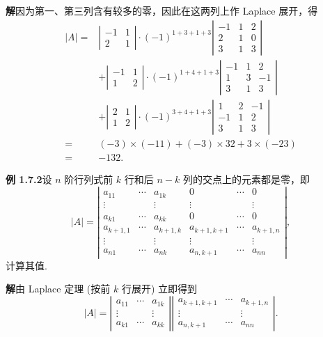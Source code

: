 \documentclass[UTF8,12pt,a4paper,fontset=fandol]{ctexart}
\begin{document}
\noindent\textbf{解}\quad 因为第一、第三列含有较多的零，因此在这两列上作 Laplace 展开，得
\[
\begin{aligned}
|A|={}&
\left|\begin{array}{rr}-1&1\\2&1\end{array}\right|
\cdot(-1)^{1+3+1+3}
\left|\begin{array}{rrr}-1&1&2\\2&1&0\\3&1&3\end{array}\right|\\
&+
\left|\begin{array}{rr}-1&1\\1&2\end{array}\right|
\cdot(-1)^{1+4+1+3}
\left|\begin{array}{rrr}-1&1&2\\1&3&-1\\3&1&3\end{array}\right|\\
&+
\left|\begin{array}{rr}2&1\\1&2\end{array}\right|
\cdot(-1)^{3+4+1+3}
\left|\begin{array}{rrr}1&2&-1\\-1&1&2\\3&1&3\end{array}\right|\\
= {}& (-3)\times(-11)+(-3)\times32+3\times(-23)\\
= {}& -132.
\end{aligned}
\]

\noindent\textbf{例 1.7.2}\quad 设 $n$ 阶行列式前 $k$ 行和后 $n-k$ 列的交点上的元素都是零，即
\[
|A|=
\left|\begin{array}{cccccc}
a_{11}&\cdots&a_{1k}&0&\cdots&0\\
\vdots&&\vdots&\vdots&&\vdots\\
a_{k1}&\cdots&a_{kk}&0&\cdots&0\\
a_{k+1,1}&\cdots&a_{k+1,k}&a_{k+1,k+1}&\cdots&a_{k+1,n}\\
\vdots&&\vdots&\vdots&&\vdots\\
a_{n1}&\cdots&a_{nk}&a_{n,k+1}&\cdots&a_{nn}
\end{array}\right|,
\]
计算其值.

\noindent\textbf{解}\quad 由 Laplace 定理 (按前 $k$ 行展开) 立即得到
\[
|A|=
\left|\begin{array}{ccc}
a_{11}&\cdots&a_{1k}\\
\vdots&&\vdots\\
a_{k1}&\cdots&a_{kk}
\end{array}\right|
\left|\begin{array}{ccc}
a_{k+1,k+1}&\cdots&a_{k+1,n}\\
\vdots&&\vdots\\
a_{n,k+1}&\cdots&a_{nn}
\end{array}\right|.
\]
\end{document}
